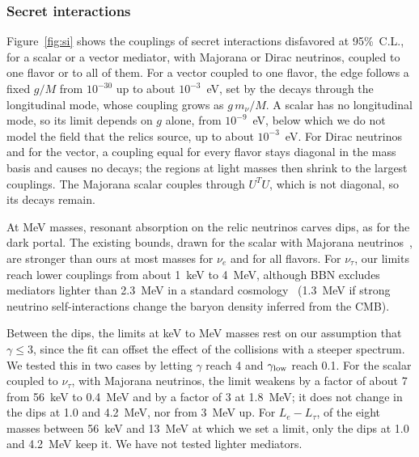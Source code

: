 \documentclass[linenumbers, aps, prd, twocolumn, superscriptaddress, floatfix, longbibliography, nofootinbib, bibnotes]{revtex4-2}
\begin{document}
\subsubsection{Secret interactions}
Figure~\ref{fig:si} shows the couplings of secret interactions disfavored at 95\%~C.L., for a scalar or a vector mediator, with Majorana or Dirac neutrinos, coupled to one flavor or to all of them.
For a vector coupled to one flavor, the edge follows a fixed $g/M$ from $10^{-30}$ up to about $10^{-3}$~eV, set by the decays through the longitudinal mode, whose coupling grows as $g\,m_\nu/M$.
A scalar has no longitudinal mode, so its limit depends on $g$ alone, from $10^{-9}$~eV, below which we do not model the field that the relics source, up to about $10^{-3}$~eV.
For Dirac neutrinos and for the vector, a coupling equal for every flavor stays diagonal in the mass basis and causes no decays; the regions at light masses then shrink to the largest couplings.
The Majorana scalar couples through $U^T U$, which is not diagonal, so its decays remain.

At MeV masses, resonant absorption on the relic neutrinos carves dips, as for the dark portal.
The existing bounds, drawn for the scalar with Majorana neutrinos~\cite{Blinov:2019gcj, Brdar:2020nbj, Berryman:2022hds}, are stronger than ours at most masses for $\nu_e$ and for all flavors.
For $\nu_\tau$, our limits reach lower couplings from about 1~keV to 4~MeV, although BBN excludes mediators lighter than 2.3~MeV in a standard cosmology~\cite{Blinov:2019gcj} (1.3~MeV if strong neutrino self-interactions change the baryon density inferred from the CMB).

Between the dips, the limits at keV to MeV masses rest on our assumption that $\gamma \leq 3$, since the fit can offset the effect of the collisions with a steeper spectrum.
We tested this in two cases by letting $\gamma$ reach 4 and $\gamma_{\rm low}$ reach 0.1.
For the scalar coupled to $\nu_\tau$, with Majorana neutrinos, the limit weakens by a factor of about 7 from 56~keV to 0.4~MeV and by a factor of 3 at 1.8~MeV; it does not change in the dips at 1.0 and 4.2~MeV, nor from 3~MeV up.
For $L_e - L_\tau$, of the eight masses between 56~keV and 13~MeV at which we set a limit, only the dips at 1.0 and 4.2~MeV keep it.
We have not tested lighter mediators.
\end{document}
